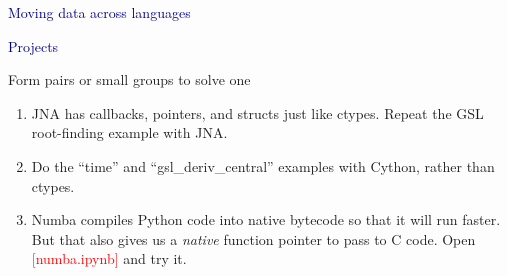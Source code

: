 \documentclass{beamer}
\begin{document}
\begin{frame}{}
\begin{center}
\textcolor{darkblue}{\LARGE Moving data across languages}
\end{center}
\end{frame}









\begin{frame}{}
\begin{center}
\textcolor{darkblue}{\LARGE Projects}
\end{center}
\end{frame}

\begin{frame}{Form pairs or small groups to solve one}
\begin{enumerate}
\item JNA has callbacks, pointers, and structs just like ctypes. Repeat the GSL root-finding example with JNA.
\item Do the ``time'' and ``gsl\_deriv\_central'' examples with Cython, rather than ctypes.
\item Numba compiles Python code into native bytecode so that it will run faster. But that also gives us a {\it native} function pointer to pass to C code. Open \textcolor{red}{[numba.ipynb]} and try it.




\end{enumerate}
\end{frame}
\end{document}
